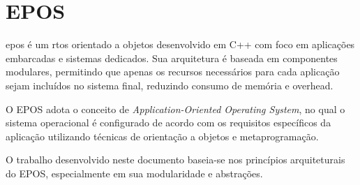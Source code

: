 \section{EPOS}

\gls{epos}  é um \gls{rtos} orientado a objetos desenvolvido em C++ com foco em aplicações embarcadas e sistemas dedicados.
Sua arquitetura é baseada em componentes modulares, permitindo que apenas os recursos necessários para cada aplicação sejam incluídos no sistema final,
reduzindo consumo de memória e overhead.

O EPOS adota o conceito de \textit{Application-Oriented Operating System}, no qual o sistema operacional é configurado de acordo com os
requisitos específicos da aplicação utilizando técnicas de orientação a objetos e metaprogramação.

O trabalho desenvolvido neste documento baseia-se nos princípios arquiteturais do EPOS, especialmente em sua modularidade e abstrações.
